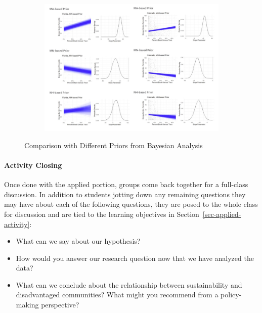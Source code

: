 \documentclass[
  12pt,
  letterpaper,
  DIV=11,
  numbers=noendperiod]{scrartcl}
\let\oldparagraph\paragraph
\renewcommand{\paragraph}[1]{\oldparagraph{#1}\mbox{}}
\providecommand{\tightlist}{%
  \setlength{\itemsep}{0pt}\setlength{\parskip}{0pt}}\usepackage{longtable,booktabs,array}
\begin{document}
\begin{figure}[H]

{\centering 

\begin{figure}[H]

{\centering \includegraphics[width=1\textwidth,height=\textheight]{01-mpsa-bayescomp.png}

}

\end{figure}

}

\caption{\label{fig-comparison}Comparison with Different Priors from
Bayesian Analysis}

\end{figure}

\hypertarget{sec-activity-close}{%
\paragraph{Activity Closing}\label{sec-activity-close}}

Once done with the applied portion, groups come back together for a
full-class discussion. In addition to students jotting down any
remaining questions they may have about each of the following questions,
they are posed to the whole class for discussion and are tied to the
learning objectives in Section~\ref{sec-applied-activity}:

\begin{itemize}
\tightlist
\item
  What can we say about our hypothesis?
\item
  How would you answer our research question now that we have analyzed
  the data?
\item
  What can we conclude about the relationship between sustainability and
  disadvantaged communities? What might you recommend from a
  policy-making perspective?
\end{itemize}
\end{document}
